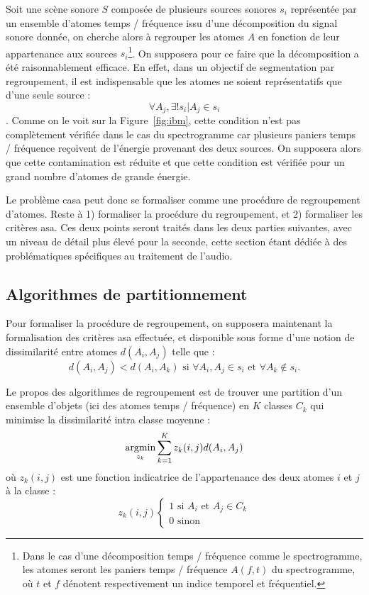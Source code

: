 Soit une scène sonore $S$ composée de plusieurs sources sonores $s_i$ représentée par un ensemble d'atomes temps / fréquence issu d'une décomposition du signal sonore donnée, on cherche alors à regrouper les atomes $A$ en fonction de leur appartenance aux sources $s_i$\footnote{Dans le cas d'une décomposition temps / fréquence comme le spectrogramme, les atomes seront les paniers temps / fréquence  $A(f, t)$ du spectrogramme, où $t$ et $f$ dénotent respectivement un indice temporel et fréquentiel.}. On supposera pour ce faire que la décomposition a été raisonnablement efficace. En effet, dans un objectif de segmentation par regroupement, il est indispensable que les atomes ne soient représentatifs que d'une seule source : $$\forall A_j, \exists ! s_i | A_j \in s_i$$. Comme on le voit sur la Figure~\ref{fig:ibm}, cette condition n'est pas complètement vérifiée dans le cas du spectrogramme car plusieurs paniers temps / fréquence reçoivent de l'énergie provenant des deux sources. On supposera alors que cette contamination est réduite et que cette condition est vérifiée pour un grand nombre d'atomes de grande énergie.

Le problème casa peut donc se formaliser comme une procédure de regroupement d'atomes. Reste à 1) formaliser la procédure du regroupement, et 2) formaliser les critères asa. Ces deux points seront traités dans les deux parties suivantes, avec un niveau de détail plus élevé pour la seconde, cette section étant dédiée à des problématiques spécifiques au traitement de l'audio.

\subsection{Algorithmes de partitionnement}

Pour formaliser la procédure de regroupement, on supposera maintenant la formalisation des critères asa effectuée, et disponible sous forme d'une notion de dissimilarité entre atomes $d(A_i, A_j)$ telle que : $$d(A_i, A_j) < d(A_i, A_k) \text{ si } \forall A_i, A_j \in s_i \text{ et } \forall A_k \notin s_i.$$


Le propos des algorithmes de regroupement est de trouver une partition d'un ensemble d'objets (ici des atomes temps / fréquence) en $K$ classes $C_k$ qui minimise la dissimilarité intra classe moyenne :
\begin{equation}
  \operatorname*{argmin}_{z_k} \sum_{k=1}^{K} z_k(i, j) d(A_i, A_j)
\end{equation}
où $z_k(i, j)$ est une fonction indicatrice de l'appartenance des deux atomes $i$ et $j$ à la classe :
\begin{equation}
  z_k(i, j)
  \begin{cases}
    1 \text{ si } A_i \text{ et } A_j \in C_k \\
    0 \text{ sinon}
  \end{cases}
\end{equation}

